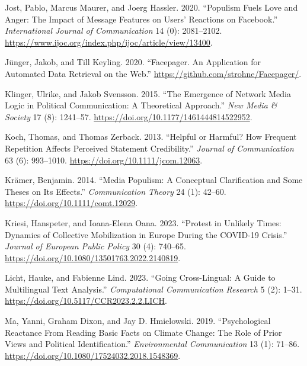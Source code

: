 \documentclass[
]{ccr}
\newlength{\cslhangindent}
\newlength{\cslentryspacingunit} %
\newenvironment{CSLReferences}[2] %
 {%
  \setlength{\parindent}{0pt}
  \ifodd #1
  \let\oldpar\par
  \def\par{\hangindent=\cslhangindent\oldpar}
  \fi
  \setlength{\parskip}{#2\cslentryspacingunit}
 }%
 {}
\begin{document}
\begin{CSLReferences}{1}{0}
\leavevmode{}%
Jost, Pablo, Marcus Maurer, and Joerg Hassler. 2020. {``Populism Fuels
Love and Anger: {The} Impact of Message Features on Users' Reactions on
{Facebook}.''} \emph{International Journal of Communication} 14 (0):
2081--2102.
\url{https://www.ijoc.org/index.php/ijoc/article/view/13400}.

\leavevmode{}%
Jünger, Jakob, and Till Keyling. 2020. {``Facepager. {An} Application
for Automated Data Retrieval on the Web.''}
\url{https://github.com/strohne/Facepager/}.

\leavevmode{}%
Klinger, Ulrike, and Jakob Svensson. 2015. {``The Emergence of Network
Media Logic in Political Communication: {A} Theoretical Approach.''}
\emph{New Media \& Society} 17 (8): 1241--57.
\url{https://doi.org/10.1177/1461444814522952}.

\leavevmode{}%
Koch, Thomas, and Thomas Zerback. 2013. {``Helpful or Harmful? {How}
Frequent Repetition Affects Perceived Statement Credibility.''}
\emph{Journal of Communication} 63 (6): 993--1010.
\url{https://doi.org/10.1111/jcom.12063}.

\leavevmode{}%
Krämer, Benjamin. 2014. {``Media Populism: {A} Conceptual Clarification
and Some Theses on Its Effects.''} \emph{Communication Theory} 24 (1):
42--60. \url{https://doi.org/10.1111/comt.12029}.

\leavevmode{}%
Kriesi, Hanspeter, and Ioana-Elena Oana. 2023. {``Protest in Unlikely
Times: Dynamics of Collective Mobilization in {Europe} During the
{COVID-19} Crisis.''} \emph{Journal of European Public Policy} 30 (4):
740--65. \url{https://doi.org/10.1080/13501763.2022.2140819}.

\leavevmode{}%
Licht, Hauke, and Fabienne Lind. 2023. {``Going Cross-Lingual: {A} Guide
to Multilingual Text Analysis.''} \emph{Computational Communication
Research} 5 (2): 1--31. \url{https://doi.org/10.5117/CCR2023.2.2.LICH}.

\leavevmode{}%
Ma, Yanni, Graham Dixon, and Jay D. Hmielowski. 2019. {``Psychological
{Reactance From Reading Basic Facts} on {Climate Change}: {The Role} of
{Prior Views} and {Political Identification}.''} \emph{Environmental
Communication} 13 (1): 71--86.
\url{https://doi.org/10.1080/17524032.2018.1548369}.


\end{CSLReferences}
\end{document}
